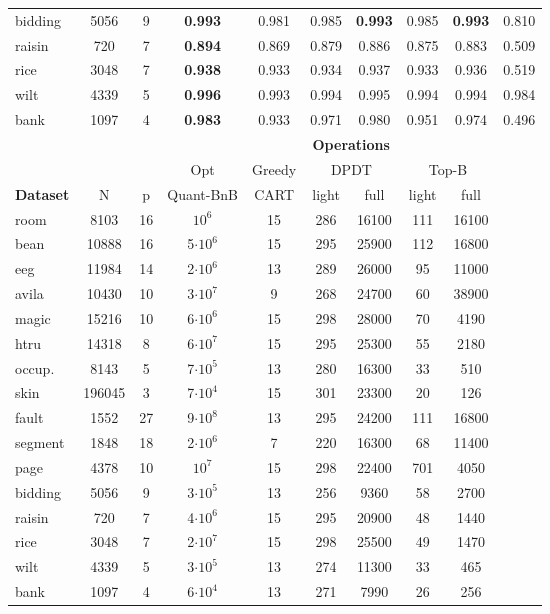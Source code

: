\begin{table}
\begin{tabular}{l|cc||cc|cc|cc|c}
    bidding & 5056 & 9  & \textbf{0.993} & 0.981 & \color{blue}0.985 & \textbf{0.993} & 0.985 & \textbf{0.993} & 0.810 \\
    raisin & 720 & 7 & \textbf{0.894} & 0.869 & 0.879 & \color{blue}0.886 & 0.875 & 0.883 & 0.509 \\
    rice & 3048 & 7 & \textbf{0.938} & 0.933 & 0.934 & \color{blue}0.937 & 0.933 & 0.936 & 0.519 \\
    wilt & 4339 & 5 & \textbf{0.996} & 0.993 & 0.994 & \color{blue}0.995 & 0.994 & 0.994 & 0.984 \\
    bank & 1097 & 4 & \textbf{0.983} & 0.933 & 0.971 & \color{blue}0.980 & 0.951 & 0.974 & 0.496 \\
    \midrule
    & & & \multicolumn{7}{c}{\textbf{Operations}}\\
    \midrule
    & & & Opt & Greedy & \multicolumn{2}{c|}{DPDT} & \multicolumn{2}{c|}{Top-B} & \\
    \textbf{Dataset} & N & p & Quant-BnB & CART & light & full & light & full & \\
    \midrule
    room & 8103 & 16 & $10^6$ & 15 & 286 & 16100 & 111 & 16100 & \\
    bean & 10888 & 16 & 5$\cdot 10^6$ & 15 & 295 & 25900 & 112 & 16800 & \\
    eeg & 11984 & 14 & 2$\cdot 10^6$ & 13 & 289 & 26000 & 95 & 11000 & \\
    avila & 10430 & 10 & 3$\cdot 10^7$ & 9 & 268 & 24700 & 60 & 38900 & \\
    magic & 15216 & 10 & 6$\cdot 10^6$ & 15 & 298 & 28000 & 70 & 4190 & \\
    htru & 14318 & 8 & 6$\cdot 10^7$ & 15 & 295 & 25300 & 55 & 2180 & \\
    occup. & 8143 & 5 & 7$\cdot 10^5$ & 13 & 280 & 16300 & 33 & 510 & \\
    skin & 196045 & 3 & 7$\cdot 10^4$ & 15 & 301 & 23300 & 20 & 126 & \\
    fault & 1552 & 27 & 9$\cdot 10^8$ & 13 & 295 & 24200 & 111 & 16800 & \\
    segment & 1848 & 18 & 2$\cdot 10^6$ & 7 & 220 & 16300 & 68 & 11400 & \\
    page & 4378 & 10 & $10^7$ & 15 & 298 & 22400 & 701 & 4050 & \\
    bidding & 5056 & 9 & 3$\cdot 10^5$ & 13 & 256 & 9360 & 58 & 2700 & \\
    raisin & 720 & 7 & 4$\cdot 10^6$ & 15 & 295 & 20900 & 48 & 1440 & \\
    rice & 3048 & 7 & 2$\cdot 10^7$ & 15 & 298 & 25500 & 49 & 1470 & \\
    wilt & 4339 & 5 & 3$\cdot 10^5$ & 13 & 274 & 11300 & 33 & 465 & \\
    bank & 1097 & 4 & 6$\cdot 10^4$ & 13 & 271 & 7990 & 26 & 256 & \\
    \bottomrule
    \end{tabular}
\end{table}
